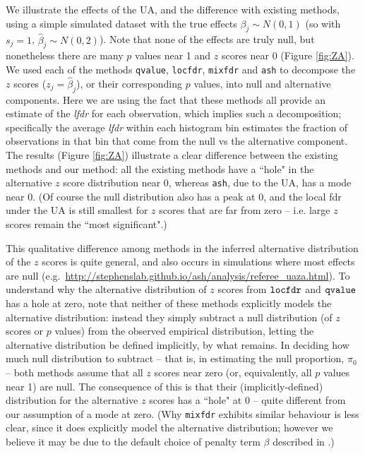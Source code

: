 \documentclass[11pt]{article}
\def\lfdr{\textit{lfdr}}
\def\bhat{\hat{\beta}}
\def\qvalue{{\tt qvalue}\xspace}
\def\locfdr{{\tt locfdr}\xspace}
\def\mixfdr{{\tt mixfdr}\xspace}
\def\ash{{\tt ash}\xspace}
\begin{document}
We illustrate the effects of the UA, and the difference with existing methods, using a simple simulated dataset
 with the true effects $\beta_j \sim N(0,1)$ (so with $s_j=1$, $\bhat_j  \sim N(0,2)$). Note that none of the effects are truly null,
but nonetheless there are many $p$ values near 1 and $z$ scores near 0 (Figure \ref{fig:ZA}).  We used each of the methods
\qvalue, \locfdr, \mixfdr and \ash to decompose the $z$ scores ($z_j = \bhat_j$), or their corresponding $p$ values, into null and alternative components.
Here we are using the fact that these methods all provide an estimate of the \lfdr{} for each observation, which
implies such a decomposition;  specifically the average \lfdr{} within each histogram bin estimates the fraction of observations in that bin that come from the null vs the alternative component. The results (Figure \ref{fig:ZA}) illustrate a clear difference between the existing methods and our method:
all the existing methods have a ``hole"  in the alternative $z$ score distribution near 0, whereas \ash, due to the UA, has a mode near 0.
(Of course the null distribution also has a peak at 0, and the local fdr 
 under the UA is still smallest for $z$ scores that are far from zero -- i.e. large $z$ scores remain the ``most significant".)
 
This qualitative difference among methods in the inferred alternative distribution of the $z$ scores is quite general, and 
also occurs in simulations where most effects are null (e.g.~\url{http://stephenslab.github.io/ash/analysis/referee_uaza.html}). To understand why the alternative distribution of $z$ scores from $\locfdr$ and $\qvalue$ has a hole at zero, note that neither
of these methods explicitly models the alternative distribution: instead they simply subtract a null distribution (of $z$ scores or $p$ values) from the observed empirical distribution, letting the alternative
distribution be defined implicitly, by what remains.
 In deciding how much null distribution to subtract -- that is, in estimating the null proportion, $\pi_0$ -- 
 both methods assume that all $z$ scores near zero (or, equivalently,
all $p$ values near 1) are null. The consequence of this is that their (implicitly-defined) distribution for the alternative $z$ scores has 
a ``hole" at 0 -- quite different from our assumption of a mode at zero. (Why \mixfdr exhibits similar behaviour is less clear, since it does explicitly
model the alternative distribution; however we believe it may be due to the default choice of penalty term $\beta$ described in \cite{muralidharan2010empirical}.)
\end{document}

